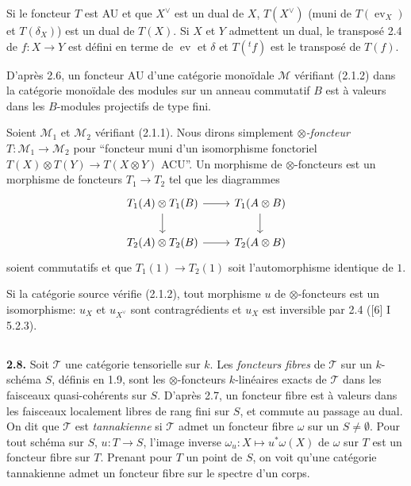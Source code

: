 \documentclass[12pt,a4paper]{article}
\theoremstyle{plain}
\theoremstyle{definition}
\theoremstyle{remark}
\DeclareMathOperator{\ev}{ev}
\begin{document}
Si le foncteur $T$ est AU et que $X^\vee$ est un dual de $X$, $T(X^\vee)$ (muni de $T(\ev_X)$ et $T(\delta_X)$) est un dual de $T(X)$. Si $X$ et $Y$ admettent un dual, le transposé 2.4 de $f : X \to Y$ est défini en terme de $\ev$ et $\delta$ et $T({}^t f)$ est le transposé de $T(f)$.

D'après 2.6, un foncteur AU d'une catégorie monoïdale $\mathcal{M}$ vérifiant (2.1.2) dans la catégorie monoïdale des modules sur un anneau commutatif $B$ est à valeurs dans les $B$-modules projectifs de type fini.

Soient $\mathcal{M}_1$ et $\mathcal{M}_2$ vérifiant (2.1.1). Nous dirons simplement \emph{$\otimes$-foncteur} $T : \mathcal{M}_1 \to \mathcal{M}_2$ pour ``foncteur muni d'un isomorphisme fonctoriel $T(X) \otimes T(Y) \to T(X \otimes Y)$ ACU''. Un morphisme de $\otimes$-foncteurs est un morphisme de foncteurs $T_1 \to T_2$ tel que les diagrammes
\[
\begin{tikzcd}
T_1(A) \otimes T_1(B) \arrow[r] \arrow[d] & T_1(A \otimes B) \arrow[d] \\
T_2(A) \otimes T_2(B) \arrow[r] & T_2(A \otimes B)
\end{tikzcd}
\]
soient commutatifs et que $T_1(1) \to T_2(1)$ soit l'automorphisme identique de $1$.

Si la catégorie source vérifie (2.1.2), tout morphisme $u$ de $\otimes$-foncteurs est un isomorphisme: $u_X$ et $u_{X^\vee}$ sont contragrédients et $u_X$ est inversible par 2.4 ([6] I 5.2.3).

\subsection{}

\textbf{2.8.} Soit $\mathcal{T}$ une catégorie tensorielle sur $k$. Les \emph{foncteurs fibres} de $\mathcal{T}$ sur un $k$-schéma $S$, définis en 1.9, sont les $\otimes$-foncteurs $k$-linéaires exacts de $\mathcal{T}$ dans les faisceaux quasi-cohérents sur $S$. D'après 2.7, un foncteur fibre est à valeurs dans les faisceaux localement libres de rang fini sur $S$, et commute au passage au dual. On dit que $\mathcal{T}$ est \emph{tannakienne} si $\mathcal{T}$ admet un foncteur fibre $\omega$ sur un $S \neq \emptyset$. Pour tout schéma sur $S$, $u : T \to S$, l'image inverse $\omega_u : X \mapsto u^*\omega(X)$ de $\omega$ sur $T$ est un foncteur fibre sur $T$. Prenant pour $T$ un point de $S$, on voit qu'une catégorie tannakienne admet un foncteur fibre sur le spectre d'un corps.
\end{document}
